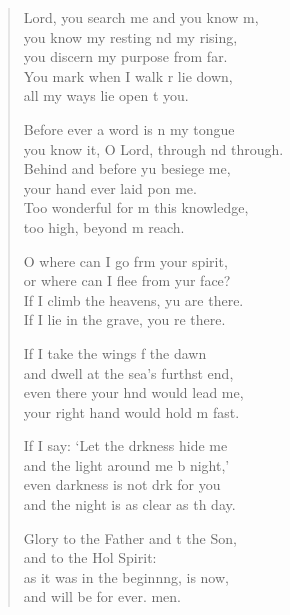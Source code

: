 \begin{verse}
  \begin{patverse}
 Lord, you search me and you know m,\Flex\\
you know my resting nd my rising,\Med\\
you discern my purpose from far.\\
You mark when I walk r lie down,\Med\\
all my ways lie open t you.

Before ever a word is n my tongue\Med\\
you know it, O Lord, through nd through.\\
Behind and before yu besiege me,\Med\\
your hand ever laid pon me.\\
Too wonderful for m this knowledge,\Med\\
too high, beyond m reach.

O where can I go frm your spirit,\Med\\
or where can I flee from yur face?\\
If I climb the heavens, yu are there.\Med\\
If I lie in the grave, you re there.

If I take the wings f the dawn\Med\\
and dwell at the sea’s furthst end,\\
even there your hnd would lead me,\Med\\
your right hand would hold m fast.

If I say: ‘Let the drkness hide me\Med\\
and the light around me b night,’\\
even darkness is not drk for you\Med\\
and the night is as clear as th day.

Glory to the Father and t the Son,\Med\\
and to the Hol Spirit:\\
as it was in the beginn\pointup{\i}ng, is now,\Med\\
and will be for ever. men.
  \end{patverse}
\end{verse}
